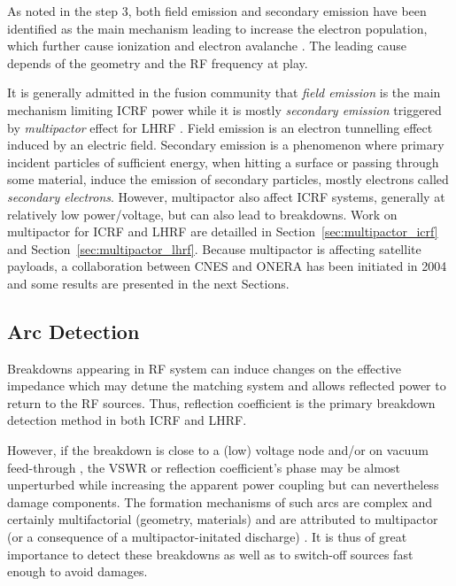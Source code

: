 As noted in the step 3, both field emission and secondary emission have been identified as the main mechanism leading to increase the electron population, which further cause ionization and electron avalanche . The leading cause depends of the geometry and the RF frequency at play. 

It is generally admitted in the fusion community that \textit{field emission} is the main mechanism limiting ICRF power while it is mostly  \textit{secondary emission} triggered by \textit{multipactor} effect for LHRF . Field emission is an electron tunnelling effect induced by an electric field. Secondary emission is a phenomenon where primary incident particles of sufficient energy, when hitting a surface or passing through some material, induce the emission of secondary particles, mostly electrons called \textit{secondary electrons}. However, multipactor also affect ICRF systems, generally at relatively low power/voltage, but can also lead to breakdowns. Work on multipactor for ICRF and LHRF are detailled in Section~\ref{sec:multipactor_icrf} and Section~\ref{sec:multipactor_lhrf}. Because multipactor is affecting satellite payloads, a collaboration between CNES and ONERA has been initiated in 2004 and some results are presented in the next Sections.



\subsection{Arc Detection}
Breakdowns appearing in RF system can induce changes on the effective impedance which may detune the matching system and allows reflected power to return to the RF sources. Thus, reflection coefficient is the primary breakdown detection method in both ICRF and LHRF. 

However, if the breakdown is close to a (low) voltage node and/or on vacuum feed-through , the VSWR or reflection coefficient’s phase may be almost unperturbed while increasing the apparent power coupling but can nevertheless damage components. The formation mechanisms of such arcs are complex and certainly multifactorial (geometry, materials) and are attributed to multipactor (or a consequence of a multipactor-initated discharge) . It is thus of great importance to detect these breakdowns as well as to switch-off sources fast enough to avoid damages. 

